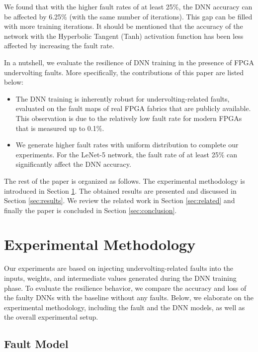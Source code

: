 \documentclass[conference]{IEEEtran}
\begin{document}
We found that with the higher fault rates of at least 25\%, the DNN accuracy can be affected by 6.25\%  (with the same number of iterations). This gap can be filled with more training iterations. It should be mentioned that the accuracy of the network with the Hyperbolic Tangent (Tanh) activation function has been less affected by increasing the fault rate. 
\color{black}

In a nutshell, we evaluate the resilience of DNN training in the presence of FPGA undervolting faults. More specifically, the contributions of this paper are listed below:
\begin{itemize}
    \item The DNN training is inherently robust for undervolting-related faults, evaluated on the fault maps of real FPGA fabrics that are publicly available. This observation is due to the relatively low fault rate for modern FPGAs that is measured up to 0.1\%. 
    \item We generate higher fault rates with uniform distribution to complete our experiments. For the LeNet-5 network, the fault rate of at least 25\% can significantly affect the DNN accuracy.
  \end{itemize} 

The rest of the paper is organized as follows. The experimental methodology is introduced in Section \ref{sec:methodology}. The obtained results are presented and discussed in Section \ref{sec:results}. We review the related work in Section \ref{sec:related} and finally the paper is concluded in Section \ref{sec:conclusion}.  

\section{Experimental Methodology}
\label{sec:methodology}
Our experiments are based on injecting undervolting-related faults into the inputs, weights, and intermediate values generated during the DNN training phase. To evaluate the resilience behavior, we compare the accuracy and loss of the faulty DNNs with the baseline without any faults. Below, we elaborate on the experimental methodology, including the fault and the DNN models, as well as the overall experimental setup. 

\subsection{Fault Model}
\end{document}
